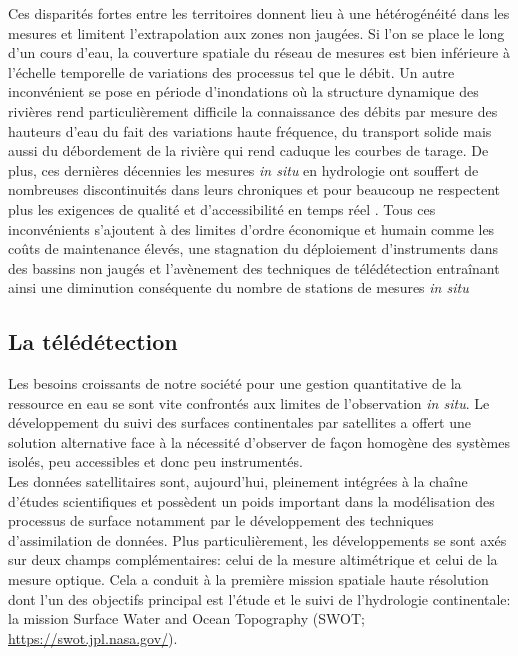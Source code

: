 \noindent Ces disparités fortes entre les territoires donnent lieu à une hétérogénéité dans les mesures et limitent l'extrapolation aux zones non jaugées. Si l'on se place le long d'un cours d'eau, la couverture spatiale du réseau de mesures est bien inférieure à l'échelle temporelle de variations des processus tel que le débit. Un autre inconvénient se pose en période d'inondations où la structure dynamique des rivières rend particulièrement difficile la connaissance des débits par mesure des hauteurs d'eau du fait des variations haute fréquence, du transport solide mais aussi du débordement de la rivière qui rend caduque les courbes de tarage. De plus, ces dernières décennies les mesures \textit{in situ} en hydrologie ont souffert de nombreuses discontinuités dans leurs chroniques et pour beaucoup ne respectent plus les exigences de qualité et d'accessibilité en temps réel \citep{shiklomanov2002, hannah2011, van2016}. Tous ces inconvénients s'ajoutent à des limites d'ordre économique et humain comme les coûts de maintenance élevés, une stagnation du déploiement d'instruments dans des bassins non jaugés et l'avènement des techniques de télédétection entraînant ainsi une diminution conséquente du nombre de stations de mesures \textit{in situ} \citep{pavelsky2014}

\subsection{{\selectfont La télédétection}}
Les besoins croissants de notre société pour une gestion quantitative de la ressource en eau se sont vite confrontés aux limites de l'observation \textit{in situ}. Le développement du suivi des surfaces continentales par satellites a offert une solution alternative face à la nécessité d'observer de façon homogène des systèmes isolés, peu accessibles et donc peu instrumentés.\\
Les données satellitaires sont, aujourd'hui, pleinement intégrées à la chaîne d'études scientifiques et possèdent un poids important dans la modélisation des processus de surface notamment par le développement des techniques d'assimilation de données. Plus particulièrement, les développements se sont axés sur deux champs complémentaires: celui de la mesure altimétrique et celui de la mesure optique. Cela a conduit à la première mission spatiale haute résolution dont l'un des objectifs principal est l'étude et le suivi de l'hydrologie continentale: la mission Surface Water and Ocean Topography (SWOT; \url{https://swot.jpl.nasa.gov/}).

